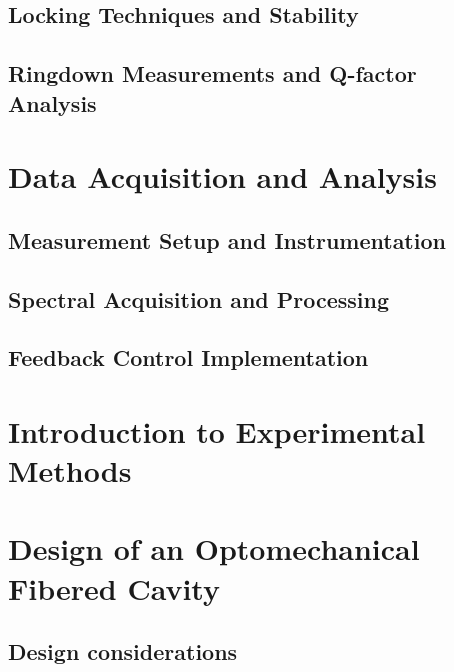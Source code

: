 \subsection{Locking Techniques and Stability}
\subsection{Ringdown Measurements and Q-factor Analysis}
\section{Data Acquisition and Analysis}
\subsection{Measurement Setup and Instrumentation}
\subsection{Spectral Acquisition and Processing}
\subsection{Feedback Control Implementation}
\section{Introduction to Experimental Methods}

\section{Design of an Optomechanical Fibered Cavity}
\subsection{Design considerations}


